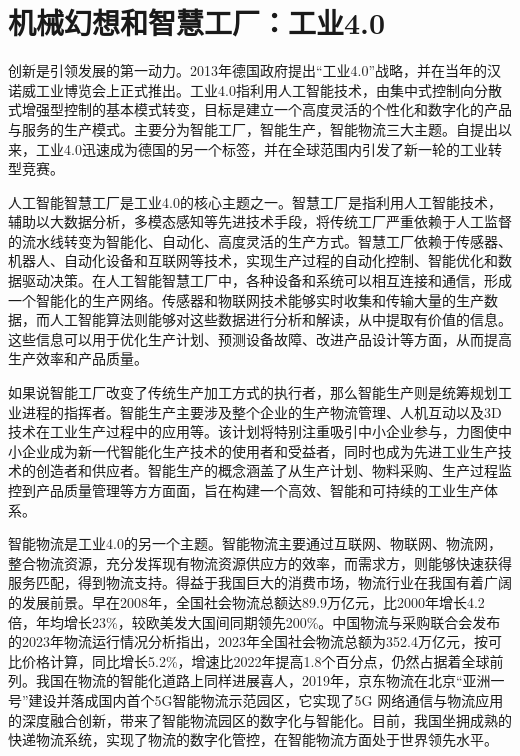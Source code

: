 \setchapterpreamble[u]{\margintoc}
\chapter{机械幻想和智慧工厂：工业4.0}

创新是引领发展的第一动力。2013年德国政府提出“工业4.0”战略，并在当年的汉诺威工业博览会上正式推出。工业4.0指利用人工智能技术，由集中式控制向分散式增强型控制的基本模式转变，目标是建立一个高度灵活的个性化和数字化的产品与服务的生产模式。主要分为智能工厂，智能生产，智能物流三大主题。自提出以来，工业4.0迅速成为德国的另一个标签，并在全球范围内引发了新一轮的工业转型竞赛。

人工智能智慧工厂是工业4.0的核心主题之一。智慧工厂是指利用人工智能技术，辅助以大数据分析，多模态感知等先进技术手段，将传统工厂严重依赖于人工监督的流水线转变为智能化、自动化、高度灵活的生产方式。智慧工厂依赖于传感器、机器人、自动化设备和互联网等技术，实现生产过程的自动化控制、智能优化和数据驱动决策。在人工智能智慧工厂中，各种设备和系统可以相互连接和通信，形成一个智能化的生产网络。传感器和物联网技术能够实时收集和传输大量的生产数据，而人工智能算法则能够对这些数据进行分析和解读，从中提取有价值的信息。这些信息可以用于优化生产计划、预测设备故障、改进产品设计等方面，从而提高生产效率和产品质量。

如果说智能工厂改变了传统生产加工方式的执行者，那么智能生产则是统筹规划工业进程的指挥者。智能生产主要涉及整个企业的生产物流管理、人机互动以及3D技术在工业生产过程中的应用等。该计划将特别注重吸引中小企业参与，力图使中小企业成为新一代智能化生产技术的使用者和受益者，同时也成为先进工业生产技术的创造者和供应者。智能生产的概念涵盖了从生产计划、物料采购、生产过程监控到产品质量管理等方方面面，旨在构建一个高效、智能和可持续的工业生产体系。

智能物流是工业4.0的另一个主题。智能物流主要通过互联网、物联网、物流网，整合物流资源，充分发挥现有物流资源供应方的效率，而需求方，则能够快速获得服务匹配，得到物流支持。得益于我国巨大的消费市场，物流行业在我国有着广阔的发展前景。早在2008年，全国社会物流总额达89.9万亿元，比2000年增长4.2倍，年均增长23\%，较欧美发大国间同期领先200\%。中国物流与采购联合会发布的2023年物流运行情况分析指出，2023年全国社会物流总额为352.4万亿元，按可比价格计算，同比增长5.2\%，增速比2022年提高1.8个百分点，仍然占据着全球前列。我国在物流的智能化道路上同样进展喜人，2019年，京东物流在北京“亚洲一号”建设并落成国内首个5G智能物流示范园区，它实现了5G 网络通信与物流应用的深度融合创新，带来了智能物流园区的数字化与智能化。目前，我国坐拥成熟的快递物流系统，实现了物流的数字化管控，在智能物流方面处于世界领先水平。

